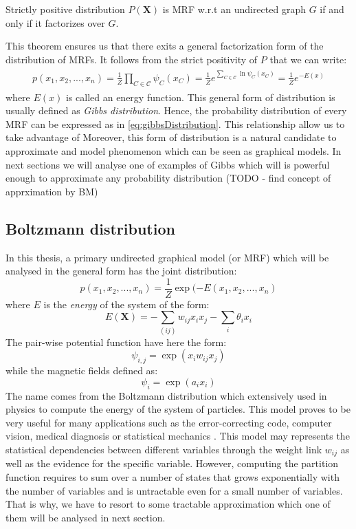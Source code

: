 \documentclass[../report/report.tex]{subfiles}
\begin{document}
\begin{theorem}  Strictly positive distribution $P(\mathbf{X})$ is MRF  w.r.t an undirected graph $G$ if and only if it factorizes over $G$.
\end{theorem}
This theorem ensures us that there exits a general factorization form of the distribution of MRFs. It follows from the strict positivity of $P$ that we can write:
\begin{align*}
\begin{split}
p(x_1, x_2, ..., x_n) = \frac{1}{Z} \prod_{C \in \mathcal{C}} \psi
_C(x_C) = \frac{1}{Z} e ^{\sum_{C \in \mathcal{C}} \ln \psi
_C(x_C) } = \frac{1}{Z} e ^{-E(x)}
\end{split}
\label{eq:gibbsDistribution}
\end{align*}
where $E(x)$ is called an energy function. This general form of distribution is usually defined as \emph{Gibbs distribution}. Hence, the probability distribution of every MRF can be expressed as in \ref{eq:gibbsDistribution}. 
This relationship allow us to take advantage of  Moreover, this form of distribution is a natural candidate to approximate and model phenomenon which can be seen as graphical models. In next sections we will analyse one of examples of Gibbs which will is powerful enough to approximate any probability distribution (TODO  - find concept of apprximation by BM)

\subsection{Boltzmann distribution}
In this thesis, a primary undirected graphical model (or MRF) which will be analysed in the general form has the joint distribution:
$$p(x_1,x_2, ..., x_n) = \frac{1}{Z}\exp(-E(x_1,x_2, ..., x_n)$$
where $E$ is the \emph{energy} of the system of the form:
$$E(\mathbf{X}) = -\sum_{(ij)} w_{ij} x_i x_j -\sum_i  \theta_i x_i$$
The pair-wise potential function have here the form:
$$\psi_{i,j} = \exp(x_i w_{ij} x_j)$$
while the magnetic fields defined as:
$$\psi_i = \exp(a_i x_i)$$
The name comes from the Boltzmann distribution which extensively used in physics to compute the energy of the system of particles. This model proves to be very useful for many applications such as the error-correcting code, computer vision, medical diagnosis or statistical mechanics \cite{yedidia2001idiosyncratic}. This model may represents the statistical dependencies between different variables through the weight link $w_{ij}$ as well as the evidence for the specific variable. However, computing the partition function requires to sum over a number of states that grows exponentially with the number of variables and is untractable even for a small number of variables. That is why, we have to resort to some tractable approximation which one of them will be analysed in next section.
\end{document}
